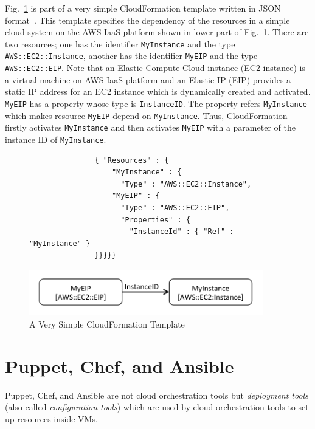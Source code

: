 \documentclass[12pt]{report}
\begin{document}
Fig.~\ref{fig:AWSExample} is part of a very simple CloudFormation
template written in JSON format~\cite{JSON}.  This template specifies
the dependency of the resources in a simple cloud system on the AWS
IaaS platform shown in lower part of Fig.~\ref{fig:AWSExample}.  There are two
resources; one has the identifier {\tt MyInstance} and the type {\tt
  AWS::EC2::Instance}, another has the identifier {\tt MyEIP} and the
type {\tt AWS::EC2::EIP}. Note that an Elastic Compute Cloud instance
(EC2 instance) is a virtual machine on AWS IaaS platform and an
Elastic IP (EIP) provides a static IP address for an EC2 instance
which is dynamically created and activated. {\tt MyEIP} has a property
whose type is {\tt InstanceID}. The property refers {\tt MyInstance}
which makes resource {\tt MyEIP} depend on {\tt MyInstance}. Thus,
CloudFormation firstly activates {\tt MyInstance} and then activates
{\tt MyEIP} with a parameter of the instance ID of {\tt MyInstance}.
\begin{figure}
\small
\begin{verbatim}
               { "Resources" : {
                   "MyInstance" : {
                     "Type" : "AWS::EC2::Instance",
                   "MyEIP" : {
                     "Type" : "AWS::EC2::EIP",
                     "Properties" : {
                       "InstanceId" : { "Ref" : "MyInstance" }
               }}}}}
\end{verbatim}
\normalsize
\centering
\includegraphics[height=2cm,natwidth=396,natheight=78]{./exaws.png}
\vspace{-0.3cm}
\caption{A Very Simple CloudFormation Template}
\label{fig:AWSExample}
\end{figure}

\section{Puppet, Chef, and Ansible}
\label{sec:PCA}
Puppet, Chef, and Ansible are not cloud orchestration tools but {\it
  deployment tools} (also called {\it configuration tools}) which are
used by cloud orchestration tools to set up resources inside VMs.
\end{document}
